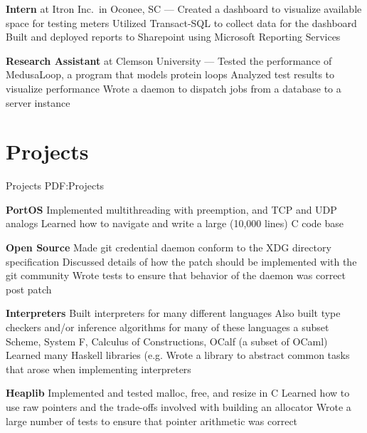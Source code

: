 \documentclass[letterpaper,10pt,oneside]{simpleresume}
\begin{document}
\begin{minipage}[t][0pt]{\linewidth}
\begin{body}
\textbf{Intern} at Itron Inc.\ in Oconee, SC
\hfill
{} --- 
\BulletItem%
Created a dashboard to visualize available space for testing meters
\BulletItem%
Utilized Transact-SQL to collect data for the dashboard
\BulletItem%
Built and deployed reports to Sharepoint using Microsoft Reporting Services

\textbf{Research Assistant} at Clemson University
\hfill
{} --- 
\BulletItem%
Tested the performance of MedusaLoop, a program that models protein loops
\BulletItem%
Analyzed test results to visualize performance
\BulletItem%
Wrote a daemon to dispatch jobs from a database to a server instance

\section%
{Projects}
{Projects}
{PDF:Projects}

\textbf{PortOS}
\BulletItem%
Implemented multithreading with preemption, and TCP and UDP analogs
\BulletItem%
Learned how to navigate and write a large (10,000 lines) C code base
\GapNoBreak%

\textbf{Open Source}
\BulletItem%
Made git credential daemon conform to the XDG directory specification
\BulletItem%
Discussed details of how the patch should be implemented with the git community
\BulletItem%
Wrote tests to ensure that behavior of the daemon was correct post patch
\GapNoBreak%

\textbf{Interpreters}
\BulletItem%
Built interpreters for many different languages
\BulletItem%
Also built type checkers and/or inference algorithms for many of these languages
\BulletItem%
a subset Scheme, System F, Calculus of Constructions, OCalf (a subset of OCaml)
\BulletItem%
Learned many Haskell libraries (e.g.
\BulletItem%
Wrote a library to abstract common tasks that arose when implementing
interpreters
\GapNoBreak%

\textbf{Heaplib}
\BulletItem%
Implemented and tested malloc, free, and resize in C
\BulletItem%
Learned how to use raw pointers and the trade-offs involved with building
an allocator
\BulletItem%
Wrote a large number of tests to ensure that pointer arithmetic was correct
\GapNoBreak%



\end{body}
\end{minipage}
\end{document}
